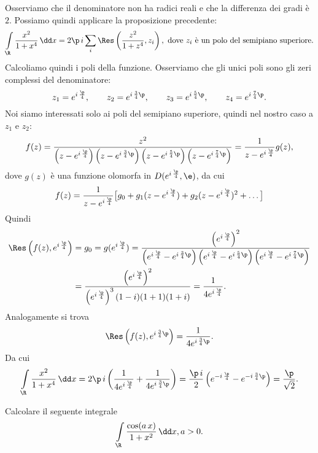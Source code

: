 \begin{sol}
	Osserviamo che il denominatore non ha radici reali e che la differenza dei gradi è \(2\).
	Possiamo quindi applicare la proposizione precedente:
	\[
		\int\limits_\R \frac{x^2}{1+x^4}\,\dd x = 2\p\,i \sum_i \Res \left( \frac{z^2}{1+z^4},z_i \right),\text{ dove \(z_i\) è un polo del semipiano superiore}.
	\]
	Calcoliamo quindi i poli della funzione. Osserviamo che gli unici poli sono gli zeri complessi del denominatore:
	\[
		z_1 = e^{i\,\frac{\p}{4}}, \qquad z_2 = e^{i\,\frac{3}{4}\p}, \qquad z_3 = e^{i\,\frac{5}{4}\p}, \qquad z_4 = e^{i\,\frac{7}{4}\p}.
	\]
	Noi siamo interessati solo ai poli del semipiano superiore, quindi nel nostro caso a \(z_1\) e \(z_2\):
	\[
		f(z) = \frac{z^2}{\left( z-e^{i\,\frac{\p}{4}} \right)\left( z-e^{i\,\frac{3}{4}\p} \right)\left( z-e^{i\,\frac{5}{4}\p} \right)\left( z-e^{i\,\frac{7}{4}\p} \right)} = \frac{1}{z-e^{i\,\frac{\p}{4}}} g(z),
	\]
	dove \(g(z)\) è una funzione olomorfa in \(D(e^{i\,\frac{\p}{4}},\e)\), da cui
	\[
		f(z) = \frac{1}{z-e^{i\,\frac{\p}{4}}} \big[g_0+g_1 (z-e^{i\,\frac{\p}{4}})+g_2 (z-e^{i\,\frac{\p}{4}})^2+\ldots\big]
	\]
	Quindi
	\[
		\begin{split}
			\Res \left( f(z),e^{i\,\frac{\p}{4}} \right) & = g_0 = g (e^{i\,\frac{\p}{4}}) = \frac{\left(e^{i\,\frac{\p}{4}}\right)^2}{\left( e^{i\,\frac{\p}{4}}-e^{i\,\frac{3}{4}\p} \right)\left( e^{i\,\frac{\p}{4}}-e^{i\,\frac{5}{4}\p} \right)\left( e^{i\,\frac{\p}{4}}-e^{i\,\frac{7}{4}\p} \right)}\\
			& = \frac{\left( e^{i\,\frac{\p}{4}} \right)^2}{\left( e^{i\,\frac{\p}{4}} \right)^3 (1-i)(1+1)(1+i)} = \frac{1}{4e^{i\,\frac{\p}{4}}}.
		\end{split}
	\]
	Analogamente si trova
	\[
		\Res \left( f(z),e^{i\,\frac{3}{4}\p} \right) = \frac{1}{4e^{i\,\frac{3}{4}\p}}.
	\]
	Da cui
	\[
		\int\limits_\R \frac{x^2}{1+x^4}\,\dd x = 2\p\,i \left( \frac{1}{4e^{i\,\frac{\p}{4}}} + \frac{1}{4e^{i\,\frac{3}{4}\p}} \right) = \frac{\p\,i}{2} \left( e^{-i\,\frac{\p}{4}}-e^{-i\,\frac{3}{4}\p} \right) = \frac{\p}{\sqrt{2}}.
	\]
\end{sol}

\begin{exeN}
	Calcolare il seguente integrale
	\[
		\int\limits_\R \frac{\cos(a\,x)}{1+x^2}\,\dd x, a>0.
	\]
\end{exeN}

